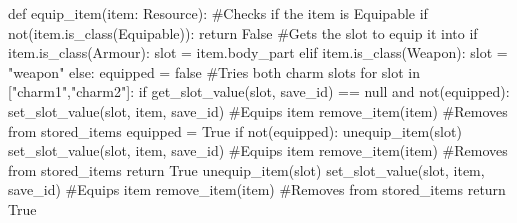 \documentclass{article}
\begin{document}
        \begin{python}
def equip_item(item: Resource):
        #Checks if the item is Equipable
        if not(item.is_class(Equipable)):
                return False
        #Gets the slot to equip it into
        if item.is_class(Armour):
                slot = item.body_part
        elif item.is_class(Weapon):
                slot = "weapon"
        else:
                equipped = false
                #Tries both charm slots
                for slot in ["charm1","charm2"]:
                        if get_slot_value(slot, save_id) == null and not(equipped):
                                set_slot_value(slot, item, save_id) #Equips item
                                remove_item(item) #Removes from stored_items
                                equipped = True
                if not(equipped):
                        unequip_item(slot)
                        set_slot_value(slot, item, save_id) #Equips item
                        remove_item(item) #Removes from stored_items
                return True
        unequip_item(slot)
        set_slot_value(slot, item, save_id) #Equips item
        remove_item(item) #Removes from stored_items
        return True     
        \end{python}
\end{document}
